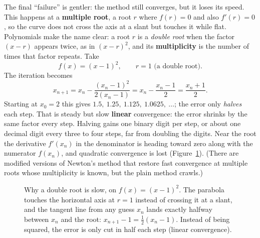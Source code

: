 The final ``failure'' is gentler: the method still converges, but it loses its
speed. This happens at a \textbf{multiple root}, a root $r$ where $f(r) = 0$ and
also $f'(r) = 0$, so the curve does not cross the axis at a slant but touches it
while flat.
Polynomials make the name clear: a root $r$ is a \emph{double root} when the
factor $(x-r)$ appears twice, as in $(x-r)^2$, and its \textbf{multiplicity} is
the number of times that factor repeats.
Take
\[
  f(x) = (x-1)^2, \qquad r = 1 \text{ (a double root)}.
\]
The iteration becomes
\[
  x_{n+1} = x_n - \frac{(x_n-1)^2}{2(x_n-1)} = x_n - \frac{x_n - 1}{2}
          = \frac{x_n + 1}{2}.
\]
Starting at $x_0 = 2$ this gives $1.5,\ 1.25,\ 1.125,\ 1.0625,\ \ldots$; the error
only \emph{halves} each step. That is steady but slow \textbf{linear}
convergence: the error shrinks by the same factor every step. Halving gains one
binary digit per step, or about one decimal digit every three to four steps, far
from doubling the digits. Near the root the derivative $f'(x_n)$ in the
denominator is heading toward zero along with the numerator $f(x_n)$, and
quadratic convergence is lost (Figure~\ref{ch19:fig-doubleroot}).
(There are modified versions of Newton's method that restore fast convergence at
multiple roots whose multiplicity is known, but the plain method crawls.)

\begin{figure}[H]
\centering
{}
\caption{Why a double root is slow, on $f(x)=(x-1)^2$. The parabola touches the
horizontal axis at $r=1$ instead of crossing it at a slant, and the tangent line
from any guess $x_n$ lands exactly halfway between $x_n$ and the root:
$x_{n+1}-1 = \tfrac12(x_n-1)$. Instead of being squared, the error is only cut in
half each step (linear convergence).}
\label{ch19:fig-doubleroot}
\end{figure}

